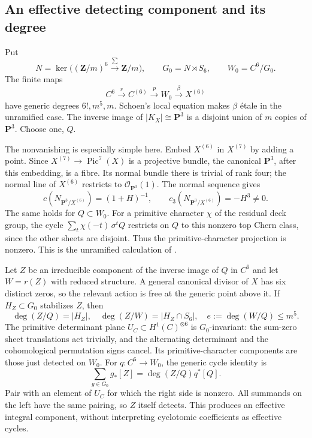 \documentclass[11pt]{article}
\theoremstyle{definition}
\theoremstyle{remark}
\newcommand{\Z}{\mathbf Z}
\begin{document}
\subsection{An effective detecting component and its degree}

Put
\[
 N=\ker\bigl((\Z/m)^6\xrightarrow{\sum}\Z/m\bigr),
 \qquad G_0=N\rtimes S_6,
 \qquad W_0=C^6/G_0.
\]
The finite maps
\[
 C^6\xrightarrow{r}C^{(6)}\xrightarrow{p}W_0
 \xrightarrow{\beta}X^{(6)}
\]
have generic degrees $6!,m^5,m$. Schoen's local equation \cite[Lemma~2.2, p.~13]{Schoen88} makes $\beta$ \'etale in the unramified case. The inverse image of $|K_X|\cong\mathbf P^3$ is a disjoint union of $m$ copies of $\mathbf P^3$. Choose one, $Q$.

The nonvanishing is especially simple here. Embed $X^{(6)}$ in $X^{(7)}$ by adding a point. Since $X^{(7)}\to\operatorname{Pic}^7(X)$ is a projective bundle, the canonical $\mathbf P^3$, after this embedding, is a fibre. Its normal bundle there is trivial of rank four; the normal line of $X^{(6)}$ restricts to $\mathcal O_{\mathbf P^3}(1)$. The normal sequence gives
\[
 c(N_{\mathbf P^3/X^{(6)}})=(1+H)^{-1},
 \qquad c_3(N_{\mathbf P^3/X^{(6)}})=-H^3\ne0.
\]
The same holds for $Q\subset W_0$. For a primitive character $\chi$ of the residual deck group, the cycle
$\sum_t\chi(-t)\,\sigma^tQ$ restricts on $Q$ to this nonzero top Chern class, since the other sheets are disjoint. Thus the primitive-character projection is nonzero. This is the unramified calculation of \cite[Lemma~2.6, p.~16]{Schoen88}.

Let $Z$ be an irreducible component of the inverse image of $Q$ in $C^6$ and let $W=r(Z)$ with reduced structure. A general canonical divisor of $X$ has six distinct zeros, so the relevant action is free at the generic point above it. If $H_Z\subset G_0$ stabilizes $Z$, then
\[
 \deg(Z/Q)=|H_Z|,
 \quad \deg(Z/W)=|H_Z\cap S_6|,
 \quad e:=\deg(W/Q)\le m^5.
\]
The primitive determinant plane $U_C\subset H^1(C)^{\otimes6}$ is $G_0$-invariant: the sum-zero sheet translations act trivially, and the alternating determinant and the cohomological permutation signs cancel. Its primitive-character components are those just detected on $W_0$. For $q:C^6\to W_0$, the generic cycle identity is
\[
 \sum_{g\in G_0}g_*[Z]=\deg(Z/Q)q^*[Q].
\]
Pair with an element of $U_C$ for which the right side is nonzero. All summands on the left have the same pairing, so $Z$ itself detects. This produces an effective integral component, without interpreting cyclotomic coefficients as effective cycles.
\end{document}
